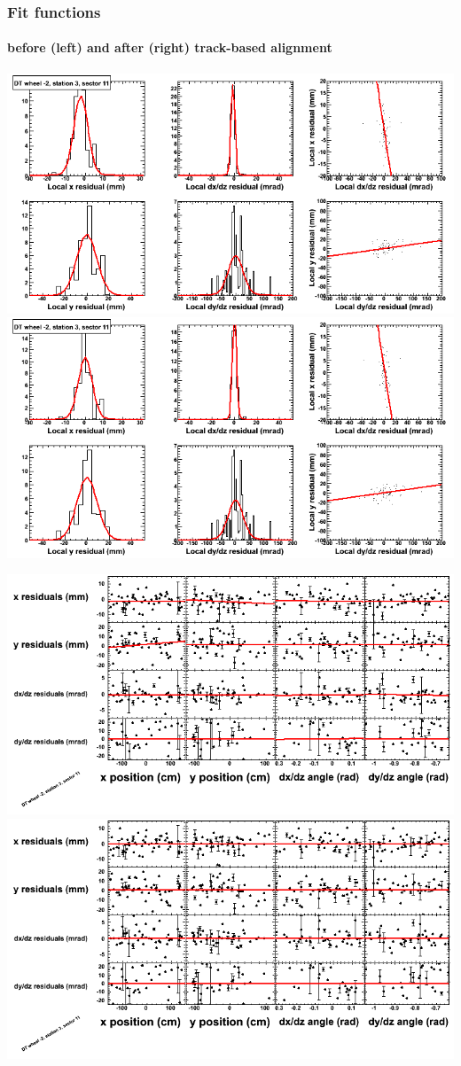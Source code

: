 \documentclass[compress]{beamer}
\begin{document}
\begin{frame}
\frametitle{Fit functions}
\framesubtitle{before (left) and after (right) track-based alignment}
\includegraphics[width=0.5\linewidth]{fitfunctions_re01/MBwhAst3sec11_bellcurves.png} \includegraphics[width=0.5\linewidth]{fitfunctions_re05/MBwhAst3sec11_bellcurves.png}

\includegraphics[width=0.5\linewidth]{fitfunctions_re01/MBwhAst3sec11_polynomials.png} \includegraphics[width=0.5\linewidth]{fitfunctions_re05/MBwhAst3sec11_polynomials.png}
\end{frame}
\end{document}
